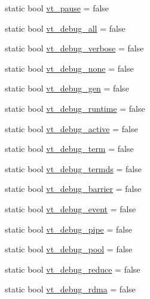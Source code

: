 \begin{DoxyCompactItemize}
\item 
static bool \hyperlink{structvt_1_1arguments_1_1_arg_config_a46f31e594725bd599f66b0a0682162bc}{vt\+\_\+pause} = false
\item 
static bool \hyperlink{structvt_1_1arguments_1_1_arg_config_a2bad2770bdb9bfb9bb8f9cd6cd9ae492}{vt\+\_\+debug\+\_\+all} = false
\item 
static bool \hyperlink{structvt_1_1arguments_1_1_arg_config_ad863fc3da4d2e0e3ce0b36647da8e29b}{vt\+\_\+debug\+\_\+verbose} = false
\item 
static bool \hyperlink{structvt_1_1arguments_1_1_arg_config_ad8244f0e0ba0f2b2cbf2bc5f58acc5b0}{vt\+\_\+debug\+\_\+none} = false
\item 
static bool \hyperlink{structvt_1_1arguments_1_1_arg_config_a6c897d45359f0cae8d31f3817bbb9b60}{vt\+\_\+debug\+\_\+gen} = false
\item 
static bool \hyperlink{structvt_1_1arguments_1_1_arg_config_ae09f0220544451872310ed5188b98d9b}{vt\+\_\+debug\+\_\+runtime} = false
\item 
static bool \hyperlink{structvt_1_1arguments_1_1_arg_config_aa40cb6ebcb449382ec1da2d73855de1f}{vt\+\_\+debug\+\_\+active} = false
\item 
static bool \hyperlink{structvt_1_1arguments_1_1_arg_config_aff950c7950ea868ccc78769a9a9ccf45}{vt\+\_\+debug\+\_\+term} = false
\item 
static bool \hyperlink{structvt_1_1arguments_1_1_arg_config_abcc1685602fa86f685601ad4f65c422e}{vt\+\_\+debug\+\_\+termds} = false
\item 
static bool \hyperlink{structvt_1_1arguments_1_1_arg_config_aa521e854796aada164cd0316c48d8e23}{vt\+\_\+debug\+\_\+barrier} = false
\item 
static bool \hyperlink{structvt_1_1arguments_1_1_arg_config_a23460617fec839e7ae8d48427172b6c5}{vt\+\_\+debug\+\_\+event} = false
\item 
static bool \hyperlink{structvt_1_1arguments_1_1_arg_config_aba00af8a95c7fd6d41d08407a5fb33f1}{vt\+\_\+debug\+\_\+pipe} = false
\item 
static bool \hyperlink{structvt_1_1arguments_1_1_arg_config_a5fce7eff37704977022f2591d19471f8}{vt\+\_\+debug\+\_\+pool} = false
\item 
static bool \hyperlink{structvt_1_1arguments_1_1_arg_config_a6001b8760c0e1d53b0e55fc8c9de784e}{vt\+\_\+debug\+\_\+reduce} = false
\item 
static bool \hyperlink{structvt_1_1arguments_1_1_arg_config_a38e43be609c02e54398d44ceca1095fe}{vt\+\_\+debug\+\_\+rdma} = false

\end{DoxyCompactItemize}
